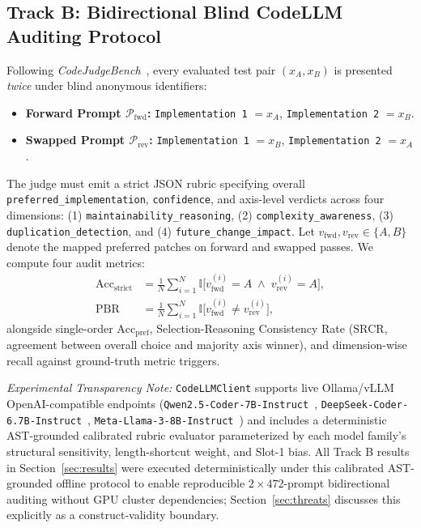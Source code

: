 \documentclass[conference]{IEEEtran}
\begin{document}
\subsection{Track B: Bidirectional Blind CodeLLM Auditing Protocol}
Following \textit{CodeJudgeBench}~\cite{codejudgebench2025}, every evaluated test pair $(x_A, x_B)$ is presented \emph{twice} under blind anonymous identifiers:
\begin{itemize}
    \item \textbf{Forward Prompt $\mathcal{P}_{\text{fwd}}$:} \texttt{Implementation 1} $= x_A$, \texttt{Implementation 2} $= x_B$.
    \item \textbf{Swapped Prompt $\mathcal{P}_{\text{rev}}$:} \texttt{Implementation 1} $= x_B$, \texttt{Implementation 2} $= x_A$.
\end{itemize}
The judge must emit a strict JSON rubric specifying overall \texttt{preferred\_implementation}, \texttt{confidence}, and axis-level verdicts across four dimensions: (1) \texttt{maintainability\_reasoning}, (2) \texttt{complexity\_awareness}, (3) \texttt{duplication\_detection}, and (4) \texttt{future\_change\_impact}. Let $v_{\text{fwd}}, v_{\text{rev}} \in \{A, B\}$ denote the mapped preferred patches on forward and swapped passes. We compute four audit metrics:
\begin{align}
    \text{Acc}_{\text{strict}} &= \frac{1}{N}\sum_{i=1}^{N}\mathbb{I}\big[v_{\text{fwd}}^{(i)} = A \;\land\; v_{\text{rev}}^{(i)} = A\big], \\
    \text{PBR} &= \frac{1}{N}\sum_{i=1}^{N}\mathbb{I}\big[v_{\text{fwd}}^{(i)} \ne v_{\text{rev}}^{(i)}\big],
\end{align}
alongside single-order $\text{Acc}_{\text{pref}}$, Selection-Reasoning Consistency Rate ($\text{SRCR}$, agreement between overall choice and majority axis winner), and dimension-wise recall against ground-truth metric triggers.

\textit{Experimental Transparency Note:} \texttt{CodeLLMClient} supports live Ollama/vLLM OpenAI-compatible endpoints (\texttt{Qwen2.5-Coder-7B-Instruct}~\cite{hui2024qwen25coder}, \texttt{DeepSeek-Coder-6.7B-Instruct}~\cite{guo2024deepseekcoder}, \texttt{Meta-Llama-3-8B-Instruct}~\cite{dubey2024llama3}) and includes a deterministic AST-grounded calibrated rubric evaluator parameterized by each model family's structural sensitivity, length-shortcut weight, and Slot-1 bias. All Track B results in Section~\ref{sec:results} were executed deterministically under this calibrated AST-grounded offline protocol to enable reproducible $2\times 472$-prompt bidirectional auditing without GPU cluster dependencies; Section~\ref{sec:threats} discusses this explicitly as a construct-validity boundary.
\end{document}
